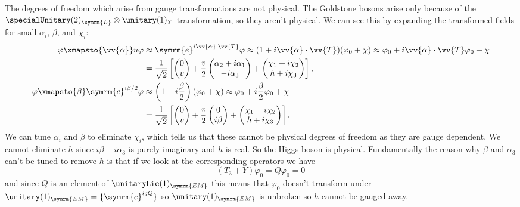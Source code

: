 \documentclass[fleqn]{NotesClass}
\newcommand{\e}{\symrm{e}}
\newcommand{\Left}{\symrm{L}}
\begin{document}
    The degrees of freedom which arise from gauge transformations are not physical.
    The Goldstone bosons arise only because of the \(\specialUnitary(2)_{\Left} \otimes \unitary(1)_Y\) transformation, so they aren't physical.
    We can see this by expanding the transformed fields for small \(\alpha_i\), \(\beta\), and \(\chi_i\):
    \begin{align}
        \varphi \xmapsto{\vv{\alpha}} u\varphi &\approx \e^{i\vv{\alpha} \cdot \vv{T}}\varphi \approx (1 + i\vv{\alpha} \cdot \vv{T})(\varphi_0 + \chi) \approx \varphi_0 + i\vv{\alpha} \cdot \vv{T}\varphi_0 + \chi \\
        &= \frac{1}{\sqrt{2}}\left[
            \begin{pmatrix}
                0\\v
            \end{pmatrix}
            + \frac{v}{2}
            \begin{pmatrix}
                \alpha_2 + i\alpha_1\\ -i\alpha_3
            \end{pmatrix}
            +
            \begin{pmatrix}
                \chi_1 + i\chi_2\\
                h + i\chi_3
            \end{pmatrix}
        \right]
        ,\\
        \varphi \xmapsto{\beta} \e^{i\beta/2}\varphi &\approx \left( 1 + i\frac{\beta}{2} \right)(\varphi_0 + \chi) \approx \varphi_0 + i\frac{\beta}{2}\varphi_0 + \chi\\
        &= \frac{1}{\sqrt{2}}\left[
            \begin{pmatrix}
                0\\ v
            \end{pmatrix}
            + \frac{v}{2}
            \begin{pmatrix}
                0\\ i\beta
            \end{pmatrix}
            +
            \begin{pmatrix}
                \chi_1 + i\chi_2\\
                h + i\chi_3
            \end{pmatrix}
        \right].
    \end{align}
    We can tune \(\alpha_i\) and \(\beta\) to eliminate \(\chi_i\), which tells us that these cannot be physical degrees of freedom as they are gauge dependent.
    We cannot eliminate \(h\) since \(i\beta - i\alpha_3\) is purely imaginary and \(h\) is real.
    So the Higgs boson is physical.
    Fundamentally the reason why \(\beta\) and \(\alpha_3\) can't be tuned to remove \(h\) is that if we look at the corresponding operators we have
    \begin{equation}
        (T_3 + Y)\varphi_0 = Q\varphi_0 = 0
    \end{equation}
    and since \(Q\) is an element of \(\unitaryLie(1)_{\symrm{EM}}\) this means that \(\varphi_0\) doesn't transform under \(\unitary(1)_{\symrm{EM}} = \{\e^{iqQ}\}\) so \(\unitary(1)_{\symrm{EM}}\) is unbroken so \(h\) cannot be gauged away.
    
\end{document}
